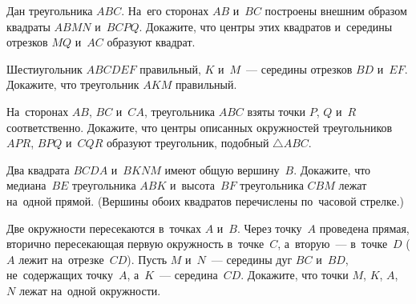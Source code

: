 \begin{problems}
\item
Дан треугольника $ABC$.
На~его сторонах $AB$ и~$BC$ построены внешним образом квадраты $ABMN$ и~$BCPQ$.
Докажите, что центры этих квадратов и~середины отрезков $MQ$ и~$AC$ образуют
квадрат.

\item
Шестиугольник $ABCDEF$ правильный, $K$ и~$M$~--- середины отрезков $BD$ и~$EF$.
Докажите, что треугольник $AKM$ правильный.

\item
На~сторонах $AB$, $BC$ и~$CA$, треугольника $ABC$ взяты точки $P$, $Q$ и~$R$
соответственно.
Докажите, что центры описанных окружностей треугольников $APR$, $BPQ$ и~$CQR$
образуют треугольник, подобный $\triangle ABC$.

\item
Два квадрата $BCDA$ и~$BKNM$ имеют общую вершину~$B$.
Докажите, что медиана~$BE$ треугольника $ABK$ и~высота~$BF$ треугольника $CBM$
лежат на~одной прямой.
(Вершины обоих квадратов перечислены по~часовой стрелке.)

\item
Две окружности пересекаются в~точках $A$ и~$B$.
Через точку~$A$ проведена прямая, вторично пересекающая первую окружность
в~точке~$C$, а~вторую~--- в~точке~$D$ ($A$ лежит на~отрезке~$CD$).
Пусть $M$ и~$N$~--- середины дуг $BC$ и~$BD$, не~содержащих точку~$A$,
а~$K$~--- середина~$CD$.
Докажите, что точки $M$, $K$, $A$, $N$ лежат на~одной окружности.





\end{problems}

\endgroup %

